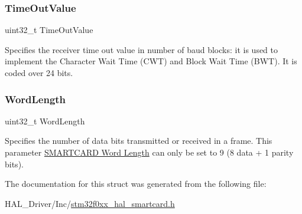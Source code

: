 \subsubsection{\texorpdfstring{Time\+Out\+Value}{TimeOutValue}}
{\footnotesize\ttfamily uint32\+\_\+t Time\+Out\+Value}

Specifies the receiver time out value in number of baud blocks\+: it is used to implement the Character Wait Time (C\+WT) and Block Wait Time (B\+WT). It is coded over 24 bits. \mbox{\label{struct_s_m_a_r_t_c_a_r_d___init_type_def_ae5e60b9a021fe0009588fc86c7584a5a}} 
\subsubsection{\texorpdfstring{Word\+Length}{WordLength}}
{\footnotesize\ttfamily uint32\+\_\+t Word\+Length}

Specifies the number of data bits transmitted or received in a frame. This parameter \hyperlink{group___s_m_a_r_t_c_a_r_d___word___length}{S\+M\+A\+R\+T\+C\+A\+RD Word Length} can only be set to 9 (8 data + 1 parity bits). 

The documentation for this struct was generated from the following file\+:\begin{DoxyCompactItemize}
\item 
H\+A\+L\+\_\+\+Driver/\+Inc/\hyperlink{stm32f0xx__hal__smartcard_8h}{stm32f0xx\+\_\+hal\+\_\+smartcard.\+h}\end{DoxyCompactItemize}
